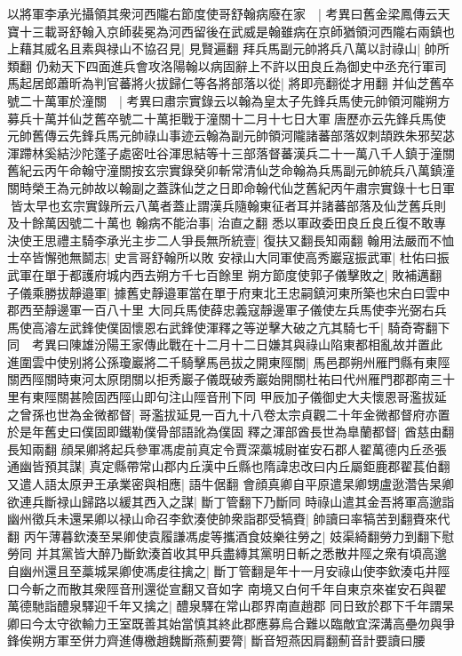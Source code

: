 以將軍李承光攝領其衆河西隴右節度使哥舒翰病廢在家　|{
	考異曰舊金梁鳳傳云天寶十三載哥舒翰入京師裴冕為河西留後在武威是翰雖病在京師猶領河西隴右兩鎮也}
上藉其威名且素與禄山不協召見|{
	見賢遍翻}
拜兵馬副元帥將兵八萬以討祿山|{
	帥所類翻}
仍勑天下四面進兵會攻洛陽翰以病固辭上不許以田良丘為御史中丞充行軍司馬起居郎蕭昕為判官蕃將火拔歸仁等各將部落以從|{
	將即亮翻從才用翻}
并仙芝舊卒號二十萬軍於潼關　|{
	考異曰肅宗實錄云以翰為皇太子先鋒兵馬使元帥領河隴朔方募兵十萬并仙芝舊卒號二十萬拒戰于潼關十二月十七日大軍唐歷亦云先鋒兵馬使元帥舊傳云先鋒兵馬元帥祿山事迹云翰為副元帥領河隴諸蕃部落奴刺頡跌朱邪契苾渾蹛林奚結沙陀蓬子處密吐谷渾思結等十三部落督蕃漢兵二十一萬八千人鎮于潼關舊紀云丙午命翰守潼關按玄宗實錄癸卯斬常清仙芝命翰為兵馬副元帥統兵八萬鎮潼關時榮王為元帥故以翰副之蓋誅仙芝之日即命翰代仙芝舊紀丙午肅宗實錄十七日軍皆太早也玄宗實錄所云八萬者蓋止謂漢兵隨翰東征者耳并諸蕃部落及仙芝舊兵則及十餘萬因號二十萬也}
翰病不能治事|{
	治直之翻}
悉以軍政委田良丘良丘復不敢專決使王思禮主騎李承光主步二人爭長無所統壹|{
	復扶又翻長知兩翻}
翰用法嚴而不恤士卒皆懈弛無鬬志|{
	史言哥舒翰所以敗}
安禄山大同軍使高秀巖寇振武軍|{
	杜佑曰振武軍在單于都護府城内西去朔方千七百餘里}
朔方節度使郭子儀擊敗之|{
	敗補邁翻}
子儀乘勝拔靜邉軍|{
	據舊史靜邉軍當在單于府東北王忠嗣鎮河東所築也宋白曰雲中郡西至靜邊軍一百八十里}
大同兵馬使薛忠義寇靜邊軍子儀使左兵馬使李光弼右兵馬使高濬左武鋒使僕固懷恩右武鋒使渾釋之等逆擊大破之亢其騎七千|{
	騎奇寄翻下同　考異曰陳雄汾陽王家傳此戰在十二月十二日嫌其與祿山陷東都相亂故并置此}
進圍雲中使别將公孫瓊巖將二千騎擊馬邑拔之開東陘關|{
	馬邑郡朔州雁門縣有東陘關西陘關時東河太原閉關以拒秀巖子儀既破秀巖始開關杜祐曰代州雁門郡郡南三十里有東陘關甚險固西陘山即句注山陘音刑下同}
甲辰加子儀御史大夫懷恩哥濫拔延之曾孫也世為金微都督|{
	哥濫拔延見一百九十八卷太宗貞觀二十年金微都督府亦置於是年舊史曰僕固即鐵勒僕骨部語訛為僕固}
釋之渾部酋長世為臯蘭都督|{
	酋慈由翻長知兩翻}
顔杲卿將起兵參軍馮䖍前真定令賈深藁城尉崔安石郡人翟萬德内丘丞張通幽皆預其謀|{
	真定縣帶常山郡内丘漢中丘縣也隋諱忠改曰内丘屬鉅鹿郡翟萇伯翻}
又遣人語太原尹王承業密與相應|{
	語牛倨翻}
會顔真卿自平原遣杲卿甥盧逖濳告杲卿欲連兵斷禄山歸路以緩其西入之謀|{
	斷丁管翻下乃斷同}
時祿山遣其金吾將軍高邈詣幽州徵兵未還杲卿以禄山命召李欽湊使帥衆詣郡受犒賚|{
	帥讀曰率犒苦到翻賚來代翻}
丙午薄暮欽湊至杲卿使袁履謙馮䖍等攜酒食妓樂往勞之|{
	妓渠綺翻勞力到翻下慰勞同}
并其黨皆大醉乃斷欽湊首收其甲兵盡縳其黨明日斬之悉散井陘之衆有頃高邈自幽州還且至藁城杲卿使馮䖍往擒之|{
	斷丁管翻是年十一月安祿山使李欽湊屯井陘口今斬之而散其衆陘音刑還從宣翻又音如字}
南境又白何千年自東京來崔安石與翟萬德馳詣醴泉驛迎千年又擒之|{
	醴泉驛在常山郡界南直趙郡}
同日致於郡下千年謂杲卿曰今太守欲輸力王室既善其始當慎其終此郡應募烏合難以臨敵宜深溝高壘勿與爭鋒俟朔方軍至併力齊進傳檄趙魏斷燕薊要膂|{
	斷音短燕因肩翻薊音計要讀曰腰}
